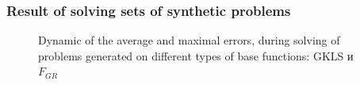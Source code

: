 \documentclass[aspectratio=1610]{beamer}
\begin{document}
\begin{frame}
  \frametitle{Result of solving sets of synthetic problems}
  \begin{figure}[ht]
    \vspace*{-0.5cm}
      \centering
      \caption{Dynamic of the average and maximal errors, during solving of problems
      generated on different types of base functions: GKLS и \(F_{GR}\)}
      \label{fig:devs_mixed}
  \end{figure}
\end{frame}
\end{document}
